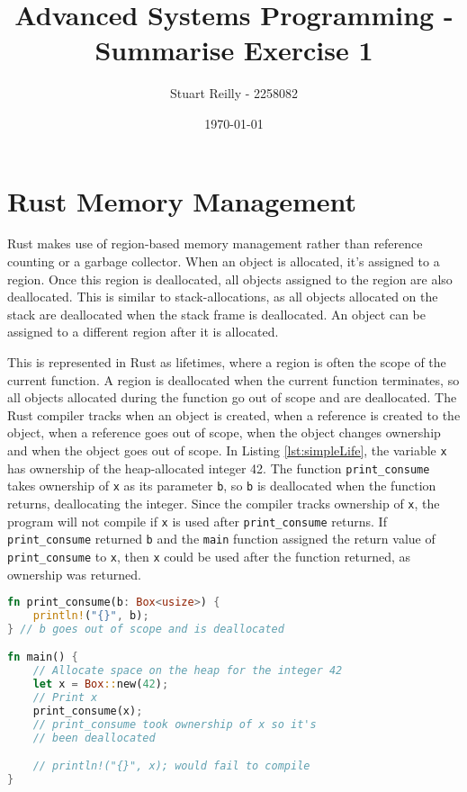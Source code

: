 \documentclass[10pt,a4paper,twocolumn]{article}
\begin{document}
\title{Advanced Systems Programming - Summarise Exercise 1}
\author{Stuart Reilly - 2258082}
\date{\today}

\maketitle

\section{Rust Memory Management}
Rust makes use of region-based memory management rather than reference counting or a garbage
collector.
When an object is allocated, it's assigned to a region.
Once this region is deallocated, all objects assigned to the region are also deallocated.
This is similar to stack-allocations, as all objects allocated on the stack are deallocated
when the stack frame is deallocated.
An object can be assigned to a different region after it is allocated.

This is represented in Rust as lifetimes, where a region is often the scope of the current
function.
A region is deallocated when the current function terminates, so all objects allocated during
the function go out of scope and are deallocated.
The Rust compiler tracks when an object is created, when a reference is created to the object,
when a reference goes out of scope, when the object changes ownership and when the object goes
out of scope.
In Listing \ref{lst:simpleLife}, the variable \lstinline{x} has ownership of the heap-allocated
integer 42.
The function \lstinline{print_consume} takes ownership of \lstinline{x} as its parameter
\lstinline{b}, so \lstinline{b} is deallocated when the function returns, deallocating the integer.
Since the compiler tracks ownership of \lstinline{x}, the program will not compile if \lstinline{x}
is used after \lstinline{print_consume} returns.
If \lstinline{print_consume} returned \lstinline{b} and the \lstinline{main} function assigned the
return value of \lstinline{print_consume} to \lstinline{x}, then \lstinline{x} could be used after
the function returned, as ownership was returned.

\begin{lstlisting}[language=Rust, float=h, label=lst:simpleLife, caption={A short example of
	when a object is allocated and deallocated in Rust.}]
fn print_consume(b: Box<usize>) {
	println!("{}", b);
} // b goes out of scope and is deallocated

fn main() {
	// Allocate space on the heap for the integer 42
	let x = Box::new(42); 
	// Print x
	print_consume(x);
	// print_consume took ownership of x so it's
	// been deallocated

	// println!("{}", x); would fail to compile
}
\end{lstlisting}
\end{document}
